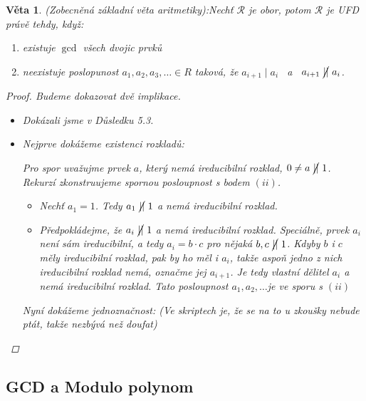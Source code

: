 \documentclass[10pt,a4paper]{article}
\newtheorem{veta}{Věta}
\begin{document}
\begin{veta} (Zobecněná základní věta aritmetiky):\normalfont Nechť $\mathcal{R}$ je obor, potom $\mathcal{R}$ je UFD právě tehdy, když:
    \begin{enumerate}[label=(\roman*)]
        \item existuje $\gcd$ všech dvojic prvků
        \item neexistuje poslopunost $a_1, a_2, a_3, \dots \in R$ taková, že $a_{i+1} \mid a_i$ ~a~ $a_{i+1} ~\cancel{\mid\mid}~ a_i$.
    \end{enumerate}
    \begin{proof} Budeme dokazovat dvě implikace.
        \begin{itemize}
            \item [$\implies$] Dokázali jsme v Důsledku 5.3. 
            \item [$\Longleftarrow$] Nejprve dokážeme \textit{existenci} rozkladů:
            
            Pro spor uvažujme prvek $a$, který nemá ireducibilní rozklad, $0\neq a ~\cancel{\mid\mid}~1$. 
            Rekurzí zkonstruujeme spornou posloupnost s bodem $(ii)$.
            \begin{itemize}
                \item Nechť $a_1 = 1$. Tedy $a_1 ~\cancel{\mid\mid}~ 1$ a nemá ireducibilní rozklad.
                \item Předpokládejme, že $a_i ~\cancel{\mid\mid}~ 1$ a nemá ireducibilní rozklad.
                Speciálně, prvek $a_i$ není sám ireducibilní, a tedy $a_i = b \cdot c$ pro nějaká $b, c ~\cancel{\mid\mid}~1$.
                Kdyby $b$ i $c$ měly ireducibilní rozklad, pak by ho měl i $a_i$, takže aspoň jedno z nich ireducibilní rozklad nemá, označme jej $a_{i+1}$.
                Je tedy vlastní dělitel $a_i$ a nemá ireducibilní rozklad. Tato posloupnost $a_1, a_2, \dots $je ve sporu s $(ii)$
            \end{itemize}
            Nyní dokážeme \textit{jednoznačnost}:
            (Ve skriptech je, že se na to u zkoušky nebude ptát, takže nezbývá než doufat)
            
        \end{itemize}
    \end{proof}
\end{veta}


\newpage
\subsection{GCD a Modulo polynom}
\end{document}
